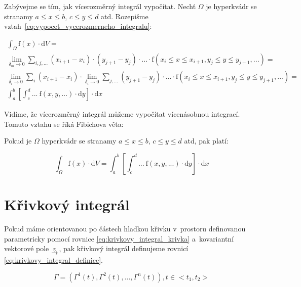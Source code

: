 Zabývejme se tím, jak vícerozměrný integrál vypočítat. Nechť \(\Omega\) je hyperkvádr se stranamy \(a \leq x \leq b\), \(c \leq y \leq d\) atd. Rozepišme vztah~\eqref{eq:vypocet_vycerozmerneho_integralu}: 

\begin{equation}
\begin{split}
\int_{\Omega} \mathrm{f}(x) \cdot \mathrm{d}V = \\
\lim_{\delta_m \to 0} \sum_{i,j,...} (x_{i+1} - x_i) \cdot (y_{j+1} - y_j) \cdot ... \cdot \mathrm{f}(x_i \leq x \leq x_{i+1}, y_j \leq y \leq y_{j+1}, ...) = \\
\lim_{\delta_i \to 0} \sum_{i} (x_{i+1} - x_i) \cdot \lim_{\delta_i \to 0} \sum_{j,...} (y_{j+1} - y_j) \cdot ... \cdot \mathrm{f}(x_i \leq x \leq x_{i+1}, y_j \leq y \leq y_{j+1}, ...) = \\
\int_a^b \left[ \int_c^d ... \ \mathrm{f}(x, y, ...) \cdot \mathrm{d}y \right] \cdot \mathrm{d}x
\end{split}
\end{equation}

Vidíme, že vícerozměrný integrál můžeme vypočítat vícenásobnou integrací. Tomuto vztahu se říká Fibichova věta:

\begin{fact}
Pokud je \(\Omega\) hyperkvádr se stranamy \(a \leq x \leq b\), \(c \leq y \leq d\) atd, pak platí:

\begin{equation}
\int_{\Omega} \mathrm{f}(x) \cdot \mathrm{d}V = 
\int_a^b \left[ \int_c^d ... \ \mathrm{f}(x, y, ...) \cdot \mathrm{d}y \right] \cdot \mathrm{d}x
\end{equation}
\end{fact}

\section{Křivkový integrál}

Pokud máme orientovanou po částech hladkou křivku v~prostoru definovanou parametricky pomocí rovnice \eqref{eq:krivkovy_integral_krivka} a~kovariantní vektorové pole \(\underrightarrow{v}\), pak křivkový integrál definujeme rovnicí \eqref{eq:krivkovy_integral_definice}.

\begin{equation}
\label{eq:krivkovy_integral_krivka}
\Gamma = (\Gamma^1(t), \Gamma^2(t), ..., \Gamma^n(t)), t \in <t_1, t_2>
\end{equation}

